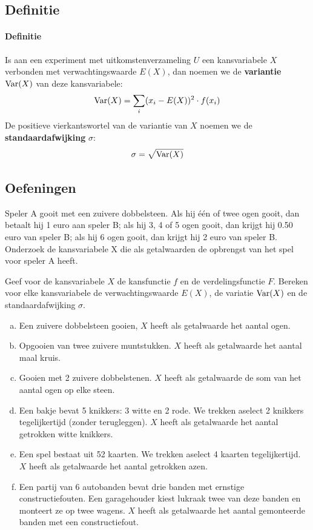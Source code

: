 \documentclass[12pt,twoside]{article}
\begin{document}
\pagebreak
\subsection{Definitie}

\paragraph*{Definitie}
\begin{mdframed}
Is aan een experiment met uitkomstenverzameling $U$ een kansvariabele $X$ verbonden met verwachtingswaarde $E(X)$, dan noemen we de {\bf variantie} $\Var(X)$ van deze kansvariabele:
$$\Var(X)=\sum_i(x_i-E(X))^2\cdot f(x_i)$$
De positieve vierkantswortel van de variantie van $X$ noemen we de {\bf standaardafwijking} $\sigma$:
$$\sigma=\sqrt{\Var(X)}$$
\end{mdframed}

\subsection{Oefeningen}

\begin{oefening}
Speler A gooit met een zuivere dobbelsteen. Als hij één of twee ogen gooit, dan betaalt hij 1 euro aan speler B; als hij 3, 4 of 5 ogen gooit, dan krijgt hij 0.50 euro van speler B; als hij 6 ogen gooit, dan krijgt hij 2 euro van speler B.\\
Onderzoek de kansvariabele X die als getalwaarden de opbrengst van het spel voor speler A heeft.
\end{oefening}

\begin{oefening}
Geef voor de kansvariabele $X$ de kansfunctie $f$ en de verdelingsfunctie $F$. Bereken voor elke kansvariabele de verwachtingswaarde $E(X)$, de variatie $\Var(X)$ en de standaardafwijking $\sigma$.
\begin{enumerate}[(a)]
  \item Een zuivere dobbelsteen gooien, $X$ heeft als getalwaarde het aantal ogen.
  \item Opgooien van twee zuivere muntstukken. $X$ heeft als getalwaarde het aantal maal kruis.
  \item Gooien met 2 zuivere dobbelstenen. $X$ heeft als getalwaarde de som van het aantal ogen op elke steen.
  \item Een bakje bevat 5 knikkers: 3 witte en 2 rode. We trekken aselect 2 knikkers tegelijkertijd (zonder terugleggen). $X$ heeft als getalwaarde het aantal getrokken witte knikkers.
  \item Een spel bestaat uit 52 kaarten. We trekken aselect 4 kaarten tegelijkertijd. $X$ heeft als getalwaarde het aantal getrokken azen.
  \item Een partij van 6 autobanden bevat drie banden met ernstige constructiefouten. Een garagehouder kiest lukraak twee van deze banden en monteert ze op twee wagens. $X$ heeft als getalwaarde het aantal gemonteerde banden met een constructiefout.
\end{enumerate}
\end{oefening}
\end{document}
